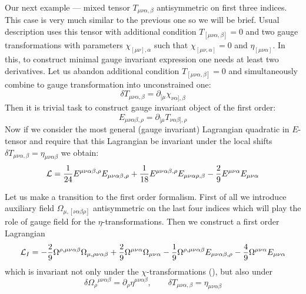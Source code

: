 \documentclass[a4paper,12pt]{article}
\begin{document}
Our next example --- mixed tensor $T_{\mu\nu\alpha,\beta}$
antisymmetric on first three indices. This case is very much similar
to the previous one so we will be brief. Usual description uses this
tensor with additional condition $T_{[\mu\nu\alpha,\beta]} = 0$ and
two gauge transformations with parameters $\chi_{[\mu\nu],\alpha}$
such that $\chi_{[\mu\nu,\alpha]} = 0$ and $\eta_{[\mu\nu\alpha]}$. In
this, to construct minimal gauge invariant expression one needs at
least two derivatives. Let us abandon additional condition
$T_{[\mu\nu\alpha,\beta]} = 0$ and simultaneously combine to gauge
transformation into unconstrained one:
\begin{equation}
\delta T_{\mu\nu\alpha,\beta} = \partial_{[\mu}
\chi_{\nu\alpha],\beta}
\end{equation}
Then it is trivial task to construct gauge invariant object of the
first order:
$$
E_{\mu\nu\alpha\beta,\rho} = \partial_{[\mu} T_{\nu\alpha\beta],\rho}
$$
Now if we consider the most general (gauge invariant) Lagrangian
quadratic in $E$-tensor and require that this Lagrangian be invariant
under the local shifts
$\delta T_{\mu\nu\alpha,\beta} = \eta_{\mu\nu\alpha\beta}$
we obtain:
\begin{equation}
{\cal L} = \frac{1}{24} E^{\mu\nu\alpha\beta,\rho}
E_{\mu\nu\alpha\beta,\rho} + \frac{1}{18} E^{\mu\nu\alpha\beta,\rho}
E_{\mu\nu\alpha\rho,\beta} - \frac{2}{9} E^{\mu\nu\alpha}
E_{\mu\nu\alpha}
\end{equation}

Let us make a transition to the first order formalism. First of all we
introduce auxiliary field $\Omega_{\mu,[\nu\alpha\beta\rho]}$
antisymmetric on the last four indices which will play the role of
gauge field for the $\eta$-transformations. Then we construct a first
order Lagrangian
\begin{equation}
{\cal L}_I = - \frac{2}{9} \Omega^{\rho,\mu\nu\alpha\beta}
\Omega_{\mu,\rho\nu\alpha\beta} + \frac{2}{9} \Omega^{\mu\nu\alpha}
\Omega_{\mu\nu\alpha} - \frac{1}{9} \Omega^{\rho,\mu\nu\alpha\beta}
E_{\mu\nu\alpha\beta,\rho} - \frac{4}{9} \Omega^{\mu\nu\alpha}
E_{\mu\nu\alpha}
\end{equation}
which is invariant not only under the $\chi$-transformations (), but
also under
$$
\delta \Omega_\rho{}^{\mu\nu\alpha\beta} = \partial_\rho
\eta^{\mu\nu\alpha\beta}, \qquad \delta T_{\mu\nu\alpha,\beta} =
\eta_{\mu\nu\alpha\beta}
$$
\end{document}
